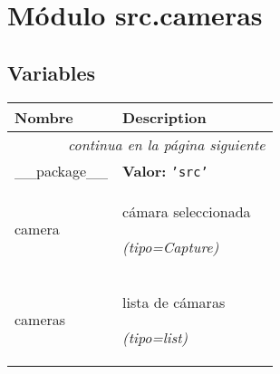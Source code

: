 %
%
%


\section{Módulo src.cameras}

    \label{src:cameras}


  \subsection{Variables}

    \vspace{-1cm}
\hspace{\varindent}\begin{longtable}{|p{\varnamewidth}|p{\vardescrwidth}|l}
\cline{1-2}
\cline{1-2} \centering \textbf{Nombre} & \centering \textbf{Description}& \\
\cline{1-2}
\endhead\cline{1-2}\multicolumn{3}{r}{\small\textit{continua en la página siguiente}}\\\endfoot\cline{1-2}
\endlastfoot\raggedright \_\-\_\-p\-a\-c\-k\-a\-g\-e\-\_\-\_\- & \raggedright \textbf{Valor:} 
{\tt \texttt{'}\texttt{src}\texttt{'}}&\\
\cline{1-2}
\raggedright c\-a\-m\-e\-r\-a\- & \raggedright cámara seleccionada

            {\it (tipo=Capture)}&\\
\cline{1-2}
\raggedright c\-a\-m\-e\-r\-a\-s\- & \raggedright lista de cámaras

            {\it (tipo=list)}&\\
\cline{1-2}
\end{longtable}



